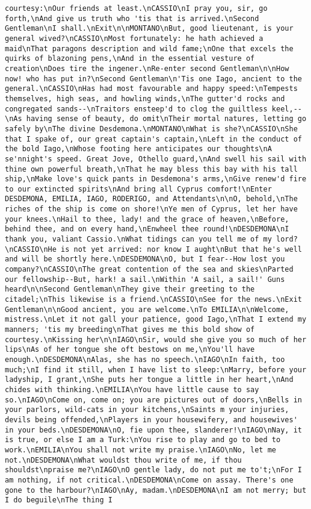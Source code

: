 \begin{verbatim}
courtesy:\nOur friends at least.\nCASSIO\nI pray you, sir, go forth,\nAnd give us truth who 'tis that is arrived.\nSecond Gentleman\nI shall.\nExit\n\nMONTANO\nBut, good lieutenant, is your general wived?\nCASSIO\nMost fortunately: he hath achieved a maid\nThat paragons description and wild fame;\nOne that excels the quirks of blazoning pens,\nAnd in the essential vesture of creation\nDoes tire the ingener.\nRe-enter second Gentleman\n\nHow now! who has put in?\nSecond Gentleman\n'Tis one Iago, ancient to the general.\nCASSIO\nHas had most favourable and happy speed:\nTempests themselves, high seas, and howling winds,\nThe gutter'd rocks and congregated sands--\nTraitors ensteep'd to clog the guiltless keel,--\nAs having sense of beauty, do omit\nTheir mortal natures, letting go safely by\nThe divine Desdemona.\nMONTANO\nWhat is she?\nCASSIO\nShe that I spake of, our great captain's captain,\nLeft in the conduct of the bold Iago,\nWhose footing here anticipates our thoughts\nA se'nnight's speed. Great Jove, Othello guard,\nAnd swell his sail with thine own powerful breath,\nThat he may bless this bay with his tall ship,\nMake love's quick pants in Desdemona's arms,\nGive renew'd fire to our extincted spirits\nAnd bring all Cyprus comfort!\nEnter DESDEMONA, EMILIA, IAGO, RODERIGO, and Attendants\n\nO, behold,\nThe riches of the ship is come on shore!\nYe men of Cyprus, let her have your knees.\nHail to thee, lady! and the grace of heaven,\nBefore, behind thee, and on every hand,\nEnwheel thee round!\nDESDEMONA\nI thank you, valiant Cassio.\nWhat tidings can you tell me of my lord?\nCASSIO\nHe is not yet arrived: nor know I aught\nBut that he's well and will be shortly here.\nDESDEMONA\nO, but I fear--How lost you company?\nCASSIO\nThe great contention of the sea and skies\nParted our fellowship--But, hark! a sail.\nWithin 'A sail, a sail!' Guns heard\n\nSecond Gentleman\nThey give their greeting to the citadel;\nThis likewise is a friend.\nCASSIO\nSee for the news.\nExit Gentleman\n\nGood ancient, you are welcome.\nTo EMILIA\n\nWelcome, mistress.\nLet it not gall your patience, good Iago,\nThat I extend my manners; 'tis my breeding\nThat gives me this bold show of courtesy.\nKissing her\n\nIAGO\nSir, would she give you so much of her lips\nAs of her tongue she oft bestows on me,\nYou'll have enough.\nDESDEMONA\nAlas, she has no speech.\nIAGO\nIn faith, too much;\nI find it still, when I have list to sleep:\nMarry, before your ladyship, I grant,\nShe puts her tongue a little in her heart,\nAnd chides with thinking.\nEMILIA\nYou have little cause to say so.\nIAGO\nCome on, come on; you are pictures out of doors,\nBells in your parlors, wild-cats in your kitchens,\nSaints m your injuries, devils being offended,\nPlayers in your housewifery, and housewives' in your beds.\nDESDEMONA\nO, fie upon thee, slanderer!\nIAGO\nNay, it is true, or else I am a Turk:\nYou rise to play and go to bed to work.\nEMILIA\nYou shall not write my praise.\nIAGO\nNo, let me not.\nDESDEMONA\nWhat wouldst thou write of me, if thou shouldst\npraise me?\nIAGO\nO gentle lady, do not put me to't;\nFor I am nothing, if not critical.\nDESDEMONA\nCome on assay. There's one gone to the harbour?\nIAGO\nAy, madam.\nDESDEMONA\nI am not merry; but I do beguile\nThe thing I 
\end{verbatim}
